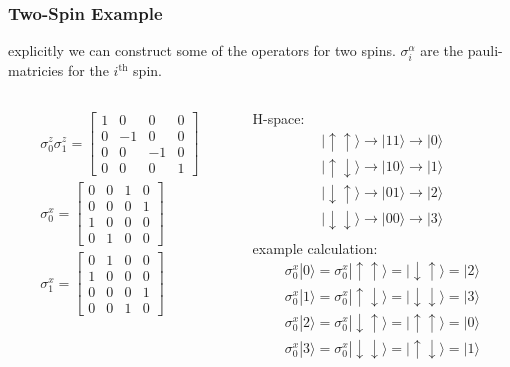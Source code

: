 \documentclass{beamer}
\newcommand\0{\scalebox{-1}[1]{0}}
\newcommand{\pz}{\sigma^z}
\newcommand{\px}{\sigma^x}
\begin{document}
\begin{frame}
	\frametitle{Two-Spin Example}
	explicitly we can construct some of the operators for two spins. $\sigma^\alpha_i$ are the pauli-matricies for the $i^\mathrm{th}$ spin.
	\begin{columns}
		\begin{column}{0.45\textwidth}
			\begin{gather*}
				\pz_0\pz_1 =
				\begin{bmatrix}
				1 & 0 & 0 & 0 \\
				0 & -1 & 0 & 0 \\
				0 & 0 & -1 & 0 \\
				0 & 0 & 0 & 1
				\end{bmatrix}\\
				\px_0=
				\begin{bmatrix}
				0 & 0 & 1 & 0 \\
				0 & 0 & 0 & 1 \\
				1 & 0 & 0 & 0 \\
				0 & 1 & 0 & 0
				\end{bmatrix}\\
				\px_1=
				\begin{bmatrix}
				0 & 1 & 0 & 0 \\
				1 & 0 & 0 & 0 \\
				0 & 0 & 0 & 1 \\
				0 & 0 & 1 & 0
				\end{bmatrix}
			\end{gather*}
		\end{column}
		\begin{column}{0.45\textwidth}
			H-space:
			\begin{gather*}
				|\uparrow\uparrow\rangle\rightarrow |11\rangle\rightarrow|0\rangle\\
				|\uparrow\downarrow\rangle\rightarrow |10\rangle\rightarrow|1\rangle\\
				|\downarrow\uparrow\rangle\rightarrow |01\rangle\rightarrow|2\rangle\\
				|\downarrow\downarrow\rangle\rightarrow |00\rangle\rightarrow|3\rangle\\
			\end{gather*}
			example calculation:
			\begin{gather*}
				\px_0|0\rangle = \px_0|\uparrow\uparrow\rangle = |\downarrow\uparrow\rangle=|2\rangle\\
				\px_0|1\rangle = \px_0|\uparrow\downarrow\rangle = |\downarrow\downarrow\rangle=|3\rangle\\
				\px_0|2\rangle = \px_0|\downarrow\uparrow\rangle = |\uparrow\uparrow\rangle=|0\rangle\\
				\px_0|3\rangle = \px_0|\downarrow\downarrow\rangle = |\uparrow\downarrow\rangle=|1\rangle
			\end{gather*}

		\end{column}
	\end{columns}
\end{frame}
\end{document}
